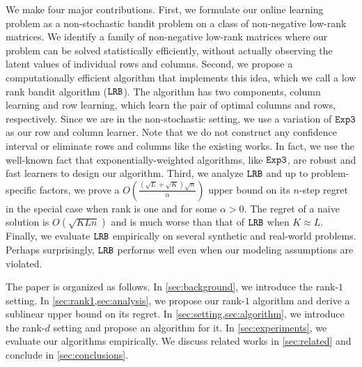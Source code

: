 We make four major contributions. First, we formulate our online learning problem as a non-stochastic bandit problem on a class of non-negative low-rank matrices. We identify a family of non-negative low-rank matrices where our problem can be solved statistically efficiently, without actually observing the latent values of individual rows and columns. Second, we propose a computationally efficient algorithm that implements this idea, which we call a low rank bandit algorithm (${\tt LRB}$). The algorithm has two components, column learning and row learning, which learn the pair of optimal columns and rows, respectively. Since we are in the non-stochastic setting, we use a variation of ${\tt Exp3}$ \citep{auer2002nonstochastic} as our row and column learner. Note that we do not construct any confidence interval or eliminate rows and columns like the existing works. In fact, we use the well-known fact that exponentially-weighted algorithms, like ${\tt Exp3}$, are robust and fast learners to design our algorithm. Third, we analyze ${\tt LRB}$ and up to problem-specific factors, we prove a $O\left(\frac{\left(\sqrt{L } + \sqrt{K }\right)\sqrt{n}}{\alpha}\right)$ upper bound on its $n$-step regret in the special case when rank is one and for some $\alpha > 0$. The regret of a naive solution is $O(\sqrt{K L n})$ and is much worse than that of ${\tt LRB}$ when $K \approx L$. Finally, we evaluate ${\tt LRB}$ empirically on several synthetic and real-world problems. Perhaps surprisingly, ${\tt LRB}$ performs well even when our modeling assumptions are violated.

The paper is organized as follows. In \cref{sec:background}, we introduce the rank-$1$ setting. In \cref{sec:rank1,sec:analysis}, we propose our rank-$1$ algorithm and derive a sublinear upper bound on its regret. In \cref{sec:setting,sec:algorithm}, we introduce the rank-$d$ setting and propose an algorithm for it. In \cref{sec:experiments}, we evaluate our algorithms empirically. We discuss related works in \cref{sec:related} and conclude in \cref{sec:conclusions}. 